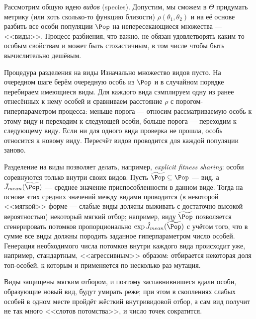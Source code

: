Рассмотрим общую идею \emph{видов} (species). Допустим, мы сможем в $\Theta$ придумать метрику (или хоть сколько-то функцию близости) $\rho(\theta_1, \theta_2)$ и на её основе разбить все особи популяции $\Pop$ на непересекающиеся множества --- <<виды>>. Процесс разбиения, что важно, не обязан удовлетворять каким-то особым свойствам и может быть стохастичным, в том числе чтобы быть вычислительно дешёвым. 

\begin{exampleBox}[label=ex:species]{Процедура разделения на виды}
Изначально множество видов пусто. На очередном шаге берём очередную особь из $\Pop$ и в случайном порядке перебираем имеющиеся виды. Для каждого вида сэмплируем одну из ранее отнесённых к нему особей и сравниваем расстояние $\rho$ с порогом-гиперпараметром процесса: меньше порога --- относим рассматриваемую особь к этому виду и переходим к следующей особи, больше порога --- переходим к следующему виду. Если ни для одного вида проверка не прошла, особь относится к новому виду. Пересчёт видов проводится для каждой популяции заново.
\end{exampleBox}

Разделение на виды позволяет делать, например, \emph{explicit fitness sharing}: особи соревнуются только внутри своих видов. Пусть $\widetilde{\Pop} \subseteq \Pop$ --- вид, а $\hat{J}_{\mathop{mean}}(\widetilde{\Pop})$ --- среднее значение приспособленности в данном виде. Тогда на основе этих средних значений между видами проводится (в некоторой <<мягкой>> форме --- слабые виды должны выживать с достаточно высокой вероятностью) некоторый мягкий отбор; например, виду $\widetilde{\Pop}$ позволяется сгенерировать потомков пропорционально $\exp \hat{J}_{\mathop{mean}}(\widetilde{\Pop})$ с учётом того, что в сумме все виды должны породить заданное гиперпараметром число особей. Генерация необходимого числа потомков внутри каждого вида происходит уже, например, стандартным, <<агрессивным>> образом: отбирается некоторая доля топ-особей, к которым и применяется по несколько раз мутация.

Виды защищены мягким отбором, и поэтому заспавнивнишеся вдали особи, образующие новый вид, будут умирать реже; при этом в скоплениях слабых особей в одном месте пройдёт жёсткий внутривидовой отбор, а сам вид получит не так много <<слотов потомства>>, и число точек сократится.

